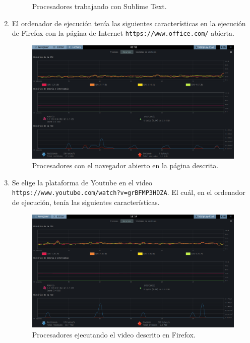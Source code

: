 \documentclass[11pt,a4paper]{article}
\begin{document}
\begin{enumerate}
\begin{figure}[hbt!]
			\caption{Procesadores trabajando con Sublime Text.}
			\label{fig:subl}
		\end{figure}
	\item[\fbox{Página Web}] El ordenador de ejecución tenía las siguientes características en la ejecución de Firefox con la página de Internet \texttt{https://www.office.com/} abierta.
		\begin{figure}[hbt!]
			\centering
			\includegraphics[width= 0.8 \linewidth]{IMAGENES/6/6_firefox_web}
			\caption{Procesadores con el navegador abierto en la página descrita.}
			\label{fig:firefox_1}
		\end{figure}
	\item[\fbox{Video Web}] Se elige la plataforma de Youtube en el video \texttt{https://www.youtube.com/watch?v=grBFMP3HDZA}.
		El cuál, en el ordenador de ejecución, tenía las siguientes características.
		\begin{figure}[hbt!]
			\centering
			\includegraphics[width= 0.8 \linewidth]{IMAGENES/6/8_firefox_video}
			\caption{Procesadores ejecutando el video descrito en Firefox.}
			\label{fig:video}
		\end{figure}
\end{enumerate}

\newpage
\end{document}
